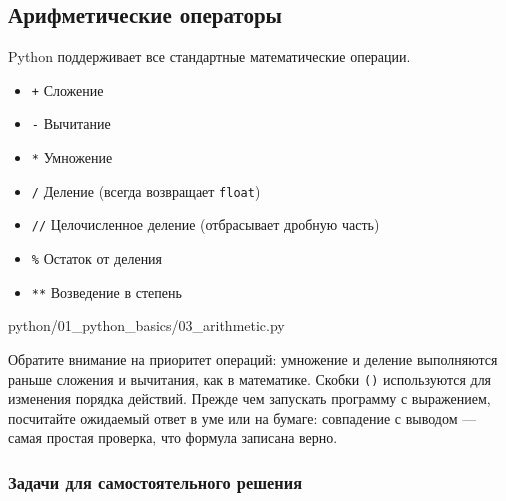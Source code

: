 \subsection{Арифметические операторы}

Python поддерживает все стандартные математические операции.

\begin{itemize}
    \item \texttt{+} Сложение
    \item \texttt{-} Вычитание
    \item \texttt{*} Умножение
    \item \texttt{/} Деление (всегда возвращает \texttt{float})
    \item \texttt{//} Целочисленное деление (отбрасывает дробную часть)
    \item \texttt{\%} Остаток от деления
    \item \texttt{**} Возведение в степень
\end{itemize}

\begin{codefile}[python]{python/01_python_basics/03_arithmetic.py}
\end{codefile}

Обратите внимание на приоритет операций: умножение и деление выполняются раньше сложения и вычитания, как в математике. Скобки \texttt{()} используются для изменения порядка действий. Прежде чем запускать программу с выражением, посчитайте ожидаемый ответ в уме или на бумаге: совпадение с выводом --- самая простая проверка, что формула записана верно.

\subsubsection*{Задачи для самостоятельного решения}

